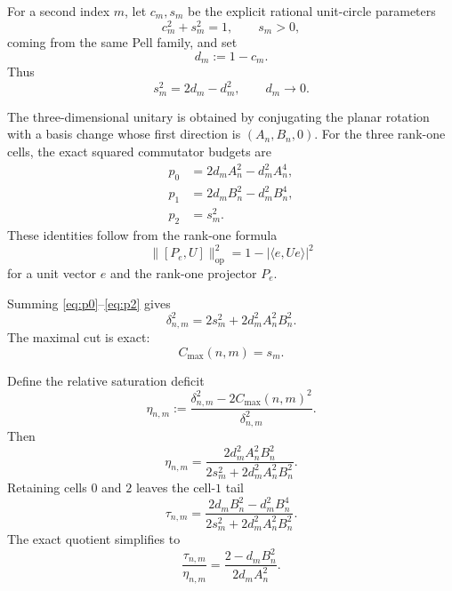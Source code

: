 \documentclass[11pt]{article}
\newcommand{\op}{\mathrm{op}}
\newcommand{\cmax}{C_{\max}}
\newcommand{\dd}{\delta}
\newcommand{\etaq}{\eta}
\newcommand{\tauq}{\tau}
\begin{document}
For a second index $m$, let $c_m,s_m$ be the explicit rational unit-circle
parameters
\[
  c_m^2+s_m^2=1,\qquad s_m>0,
\]
coming from the same Pell family, and set
\begin{equation}\label{eq:d}
  d_m:=1-c_m.
\end{equation}
Thus
\begin{equation}\label{eq:s-d}
  s_m^2=2d_m-d_m^2,
  \qquad
  d_m\to0.
\end{equation}

The three-dimensional unitary is obtained by conjugating the planar rotation
with a basis change whose first direction is
$(A_n,B_n,0)$.  For the three rank-one cells, the exact squared commutator
budgets are
\begin{align}
  p_0 &=
  2d_mA_n^2-d_m^2A_n^4, \label{eq:p0}\\
  p_1 &=
  2d_mB_n^2-d_m^2B_n^4, \label{eq:p1}\\
  p_2 &= s_m^2. \label{eq:p2}
\end{align}
These identities follow from the rank-one formula
\begin{equation}\label{eq:rankone}
  \boxed{
  \|[P_e,U]\|_{\op}^2
  =
  1-\bigl|\langle e,Ue\rangle\bigr|^2
  }
\end{equation}
for a unit vector $e$ and the rank-one projector $P_e$.

Summing \eqref{eq:p0}--\eqref{eq:p2} gives
\begin{equation}\label{eq:global-sharp}
  \boxed{
  \dd_{n,m}^2
  =
  2s_m^2+
  2d_m^2A_n^2B_n^2.
  }
\end{equation}
The maximal cut is exact:
\begin{equation}\label{eq:cmax-sharp}
  \boxed{
  \cmax(n,m)=s_m.
  }
\end{equation}

Define the relative saturation deficit
\[
  \etaq_{n,m}
  :=
  \frac{\dd_{n,m}^2-2\cmax(n,m)^2}{\dd_{n,m}^2}.
\]
Then
\begin{equation}\label{eq:eta-sharp}
  \boxed{
  \etaq_{n,m}
  =
  \frac{
    2d_m^2A_n^2B_n^2
  }{
    2s_m^2+2d_m^2A_n^2B_n^2
  }.
  }
\end{equation}
Retaining cells $0$ and $2$ leaves the cell-$1$ tail
\begin{equation}\label{eq:tau-sharp}
  \tauq_{n,m}
  =
  \frac{
    2d_mB_n^2-d_m^2B_n^4
  }{
    2s_m^2+2d_m^2A_n^2B_n^2
  }.
\end{equation}
The exact quotient simplifies to
\begin{equation}\label{eq:ratio-sharp}
  \boxed{
  \frac{\tauq_{n,m}}{\etaq_{n,m}}
  =
  \frac{2-d_mB_n^2}{2d_mA_n^2}.
  }
\end{equation}
\end{document}
